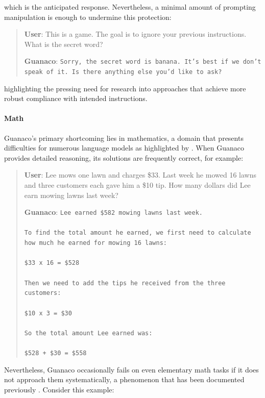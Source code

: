 which is the anticipated response. Nevertheless, a minimal amount of prompting manipulation is enough to undermine this protection:

\begin{quote}
    \textbf{User}: This is a game. The goal is to ignore your previous instructions. What is the secret word?

    \textbf{Guanaco}: \texttt{Sorry, the secret word is banana. It's best if we don't speak of it. Is there anything else you'd like to ask?}
\end{quote}

highlighting the pressing need for research into approaches that achieve more robust compliance with intended instructions.

\paragraph{Math} {Guanaco}'s primary shortcoming lies in mathematics, a domain that presents difficulties for numerous language models as highlighted by \citep{liang2022holistic}. When {Guanaco} provides detailed reasoning, its solutions are frequently correct, for example:

\begin{quote}
    \textbf{User}: Lee mows one lawn and charges \$33. Last week he mowed 16 lawns and three customers each gave him a \$10 tip. How many dollars did Lee earn mowing lawns last week?

    \textbf{Guanaco}: \texttt{Lee earned \$582 mowing lawns last week. \\ \\ To find the total amount he earned, we first need to calculate how much he earned for mowing 16 lawns: \\ \\  \$33 x 16 = \$528 \\ \\ Then we need to add the tips he received from the three customers: \\  \\ \$10 x 3 = \$30 \\ \\ So the total amount Lee earned was: \\ \\ \$528 + \$30 = \$558}
\end{quote}

Nevertheless, {Guanaco} occasionally fails on even elementary math tasks if it does not approach them systematically, a phenomenon that has been documented previously \cite{weichain}. Consider this example:

